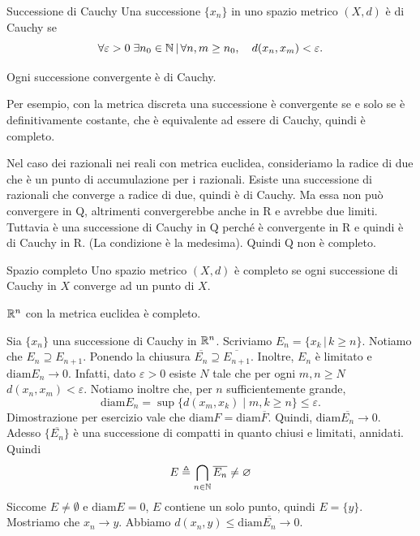 \documentclass[a4paper]{article}
\begin{document}
\begin{snippetdefinition}{Successione di Cauchy}
    Una successione \(\{x_n\}\) in uno spazio metrico \((X,d)\) è di Cauchy se
    \[
        \forall\varepsilon>0\;\exists n_0\in\mathbb{N}\,|\,
        \forall n,m\geq n_0,\quad d(x_n,x_m)<\varepsilon.
    \]
\end{snippetdefinition}

Ogni successione convergente è di Cauchy.

Per esempio, con la metrica discreta una successione è convergente se e solo se è definitivamente costante,
che è equivalente ad essere di Cauchy, quindi è completo.

Nel caso dei razionali nei reali con metrica euclidea, consideriamo la radice di due che è un punto di accumulazione
per i razionali. Esiste una successione di razionali che converge a radice di due, quindi è di Cauchy.
Ma essa non può convergere in Q, altrimenti convergerebbe anche in R e avrebbe due limiti.
Tuttavia è una successione di Cauchy in Q perché è convergente in R e quindi è di Cauchy in R.
(La condizione è la medesima). Quindi Q non è completo.

\begin{snippetdefinition}{Spazio completo}
    Uno spazio metrico \((X,d)\) è completo se ogni successione di Cauchy in \(X\)
    converge ad un punto di \(X\).
\end{snippetdefinition}

\begin{snippettheorem}{}
    \(\mathbb{R}^n\) con la metrica euclidea è completo.
\end{snippettheorem}

\begin{snippetproof}{}
    Sia \(\{x_n\}\) una successione di Cauchy in \(\mathbb{R}^n\).
    Scriviamo \(E_n = \{x_k \,|\, k \geq n\}\).
    Notiamo che \(E_n \supseteq E_{n+1}\).
    Ponendo la chiusura \(\overline{E_n} \supseteq \overline{E_{n+1}}\).
    Inoltre, \(E_n\) è limitato e \(\text{diam} E_n \to 0\).
    Infatti, dato \(\varepsilon > 0\) esiste \(N\) tale che per ogni \(m,n \geq N\)
    \(d(x_n, x_m) < \varepsilon\).
    Notiamo inoltre che, per \(n\) sufficientemente grande,
    \[
        \text{diam} E_n = \sup\{d(x_m,x_k) \mid m,k\ge n\} \leq \varepsilon.
    \]
    Dimostrazione per esercizio vale che \(\text{diam} F = \text{diam} \overline{F}\).
    Quindi, \(\text{diam} \overline{E_n} \to 0\).
    Adesso \(\{\overline{E_n}\}\) è una successione di compatti in quanto chiusi e limitati, annidati.
    Quindi \[
        E \triangleq \bigcap_{n\in \mathbb{N}} \overline{E_n} \neq \varnothing
    \]
    Siccome \(E\neq\emptyset\) e \(\text{diam} E = 0\), \(E\) contiene un solo punto, quindi \(E = \{y\}\).
    Mostriamo che \(x_n \to y\).
    Abbiamo \(d(x_n, y) \leq \text{diam} \overline{E_n} \to 0\).
\end{snippetproof}
\end{document}
